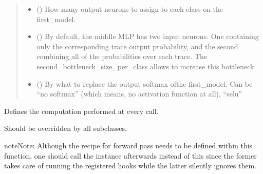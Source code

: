 \documentclass[letterpaper,10pt,english]{sphinxmanual}
\begin{document}
\begin{fulllineitems}
\begin{quote}
\begin{description}
\begin{itemize}
\item {} 
\sphinxAtStartPar
{} (\sphinxstyleliteralemphasis{\sphinxupquote{, }}) \textendash{} How many output neurons to assign to each class on the first\_model.

\item {} 
\sphinxAtStartPar
{} (\sphinxstyleliteralemphasis{\sphinxupquote{, }}) \textendash{} By default, the middle MLP has two input neurons. One containing only the corresponding
trace output probability, and the second combining all of the probabilities over each trace.
The second\_bottleneck\_size\_per\_class allows to increase this bottleneck.

\item {} 
\sphinxAtStartPar
{} (\sphinxstyleliteralemphasis{\sphinxupquote{, }}) \textendash{} By what to replace the output softmax ofthe first\_model. Can be “no softmax” (which means, no
activation function at all), “selu”

\end{itemize}

\end{description}\end{quote}

\begin{fulllineitems}
\label{\detokenize{MLSCAlib.Architectures:MLSCAlib.Architectures.torch_models.MeshNN.forward}}
\pysigstartsignatures
{}
\pysigstopsignatures
\sphinxAtStartPar
Defines the computation performed at every call.

\sphinxAtStartPar
Should be overridden by all subclasses.

\begin{sphinxadmonition}{note}{Note:}
\sphinxAtStartPar
Although the recipe for forward pass needs to be defined within
this function, one should call the  instance afterwards
instead of this since the former takes care of running the
registered hooks while the latter silently ignores them.
\end{sphinxadmonition}


\end{fulllineitems}
\end{fulllineitems}
\end{document}

